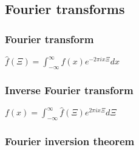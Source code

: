 
\subsection{Fourier transforms}


\subsubsection{Fourier transform}

\(\hat f(\Xi )=\int_{-\infty}^{\infty }f(x)e^{-2\pi ix\Xi }dx\) 

\subsubsection{Inverse Fourier transform}

\(f(x)=\int_{-\infty}^{\infty }\hat f(\Xi )e^{2\pi ix\Xi }d\Xi \)

\subsubsection{Fourier inversion theorem}


